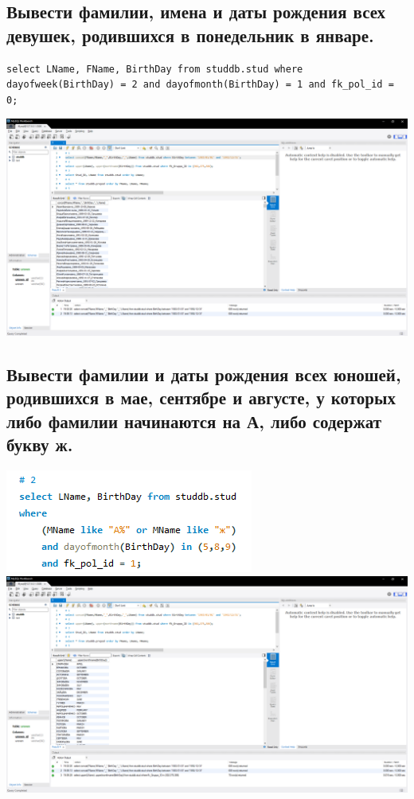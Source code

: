 \documentclass[a4paper, 12pt]{article}
\begin{document}
\subsection{Вывести фамилии, имена и даты рождения всех девушек, родившихся в понедельник в январе.}
\begin{lstlisting}
select LName, FName, BirthDay from studdb.stud where dayofweek(BirthDay) = 2 and dayofmonth(BirthDay) = 1 and fk_pol_id = 0;
\end{lstlisting}
\includegraphics[width=\textwidth]{5-1.png}

\subsection{Вывести  фамилии и даты рождения всех юношей, родившихся в мае, сентябре и августе, у которых либо фамилии начинаются на А, либо содержат букву ж.}
\includegraphics{5-2-1.png}\\
\includegraphics[width=\textwidth]{5-2.png}
\end{document}
